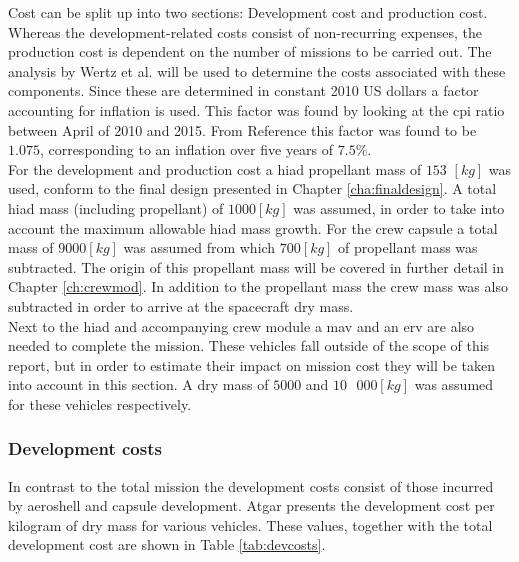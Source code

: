 Cost can be split up into two sections: Development cost and production cost. Whereas the development-related costs consist of non-recurring expenses, the production cost is dependent on the number of missions to be carried out. The analysis by Wertz et al. \cite{Wertz2011} will be used to determine the costs associated with these components. Since these are determined in constant 2010 US dollars a factor accounting for inflation is used. This factor was found by looking at the \gls{cpi} ratio between April of 2010 and 2015. From Reference \cite{Crawford2015} this factor was found to be $1.075$, corresponding to an inflation over five years of $7.5\%$.\\
For the development and production cost a \gls{hiad} propellant mass of $153$ $\left[kg\right]$ was used, conform to the final design presented in Chapter \ref{cha:finaldesign}. A total \gls{hiad} mass (including propellant) of $1000 \left[kg\right]$ was assumed, in order to take into account the maximum allowable \gls{hiad} mass growth. For the crew capsule a total mass of $9000 \left[kg\right]$ was assumed from which $700 \left[kg\right]$ of propellant mass was subtracted. The origin of this propellant mass will be covered in further detail in Chapter \ref{ch:crewmod}. In addition to the propellant mass the crew mass was also subtracted in order to arrive at the spacecraft dry mass.\\
Next to the \gls{hiad} and accompanying crew module a \gls{mav} and an \gls{erv} are also needed to complete the mission. These vehicles fall outside of the scope of this report, but in order to estimate their impact on mission cost they will be taken into account in this section. A dry mass of $5000$ and $10\mbox{ }000 \left[kg\right]$ was assumed for these vehicles respectively.

\subsubsection{Development costs}
In contrast to the total mission the development costs consist of those incurred by aeroshell and capsule development. Atgar \cite[p.296]{Wertz2011} presents the development cost per kilogram of dry mass for various vehicles. These values, together with the total development cost are shown in Table \ref{tab:devcosts}.

